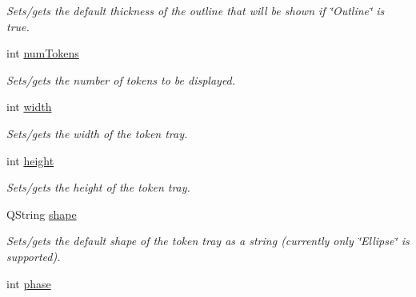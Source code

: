 \begin{DoxyCompactItemize}
\begin{DoxyCompactList}\small\item\em Sets/gets the default thickness of the outline that will be shown if \char`\"{}\-Outline\char`\"{} is true. \end{DoxyCompactList}\item 
\hypertarget{class_picto_1_1_token_tray_graphic_a7d329782ec5869e8e0c2564386e1f415}{int \hyperlink{class_picto_1_1_token_tray_graphic_a7d329782ec5869e8e0c2564386e1f415}{num\-Tokens}}\label{class_picto_1_1_token_tray_graphic_a7d329782ec5869e8e0c2564386e1f415}

\begin{DoxyCompactList}\small\item\em Sets/gets the number of tokens to be displayed. \end{DoxyCompactList}\item 
\hypertarget{class_picto_1_1_token_tray_graphic_a02feea53a9cee222c48c27162dd3ce03}{int \hyperlink{class_picto_1_1_token_tray_graphic_a02feea53a9cee222c48c27162dd3ce03}{width}}\label{class_picto_1_1_token_tray_graphic_a02feea53a9cee222c48c27162dd3ce03}

\begin{DoxyCompactList}\small\item\em Sets/gets the width of the token tray. \end{DoxyCompactList}\item 
\hypertarget{class_picto_1_1_token_tray_graphic_a86816b524f1f7299c6be46685e585b80}{int \hyperlink{class_picto_1_1_token_tray_graphic_a86816b524f1f7299c6be46685e585b80}{height}}\label{class_picto_1_1_token_tray_graphic_a86816b524f1f7299c6be46685e585b80}

\begin{DoxyCompactList}\small\item\em Sets/gets the height of the token tray. \end{DoxyCompactList}\item 
\hypertarget{class_picto_1_1_token_tray_graphic_a8635ae2a3b7939007fae31ea013ae06b}{Q\-String \hyperlink{class_picto_1_1_token_tray_graphic_a8635ae2a3b7939007fae31ea013ae06b}{shape}}\label{class_picto_1_1_token_tray_graphic_a8635ae2a3b7939007fae31ea013ae06b}

\begin{DoxyCompactList}\small\item\em Sets/gets the default shape of the token tray as a string (currently only \char`\"{}\-Ellipse\char`\"{} is supported). \end{DoxyCompactList}\item 
\hypertarget{class_picto_1_1_token_tray_graphic_a019bd4a52363392d10f7058608a03fdd}{int \hyperlink{class_picto_1_1_token_tray_graphic_a019bd4a52363392d10f7058608a03fdd}{phase}}\label{class_picto_1_1_token_tray_graphic_a019bd4a52363392d10f7058608a03fdd}


\end{DoxyCompactItemize}
